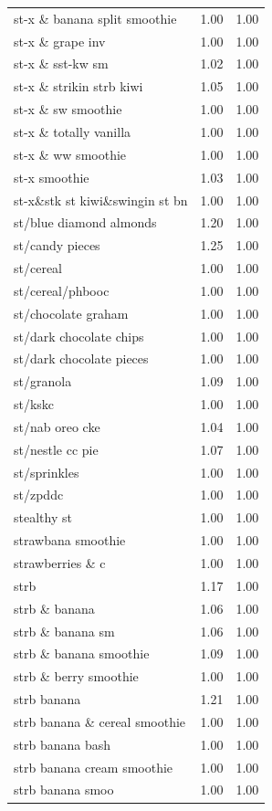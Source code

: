 \begin{table}
\begin{tabular}{lrr}
st-x \& banana split smoothie & 1.00 & 1.00 \\
st-x \& grape inv & 1.00 & 1.00 \\
st-x \& sst-kw sm & 1.02 & 1.00 \\
st-x \& strikin strb kiwi & 1.05 & 1.00 \\
st-x \& sw smoothie & 1.00 & 1.00 \\
st-x \& totally vanilla & 1.00 & 1.00 \\
st-x \& ww smoothie & 1.00 & 1.00 \\
st-x smoothie & 1.03 & 1.00 \\
st-x\&stk st kiwi\&swingin st bn & 1.00 & 1.00 \\
st/blue diamond almonds & 1.20 & 1.00 \\
st/candy pieces & 1.25 & 1.00 \\
st/cereal & 1.00 & 1.00 \\
st/cereal/phbooc & 1.00 & 1.00 \\
st/chocolate graham & 1.00 & 1.00 \\
st/dark chocolate chips & 1.00 & 1.00 \\
st/dark chocolate pieces & 1.00 & 1.00 \\
st/granola & 1.09 & 1.00 \\
st/kskc & 1.00 & 1.00 \\
st/nab oreo cke & 1.04 & 1.00 \\
st/nestle cc pie & 1.07 & 1.00 \\
st/sprinkles & 1.00 & 1.00 \\
st/zpddc & 1.00 & 1.00 \\
stealthy st & 1.00 & 1.00 \\
strawbana smoothie & 1.00 & 1.00 \\
strawberries \& c & 1.00 & 1.00 \\
strb & 1.17 & 1.00 \\
strb \& banana & 1.06 & 1.00 \\
strb \& banana sm & 1.06 & 1.00 \\
strb \& banana smoothie & 1.09 & 1.00 \\
strb \& berry smoothie & 1.00 & 1.00 \\
strb banana & 1.21 & 1.00 \\
strb banana \& cereal smoothie & 1.00 & 1.00 \\
strb banana bash & 1.00 & 1.00 \\
strb banana cream smoothie & 1.00 & 1.00 \\
strb banana smoo & 1.00 & 1.00 \\

\end{tabular}
\end{table}
